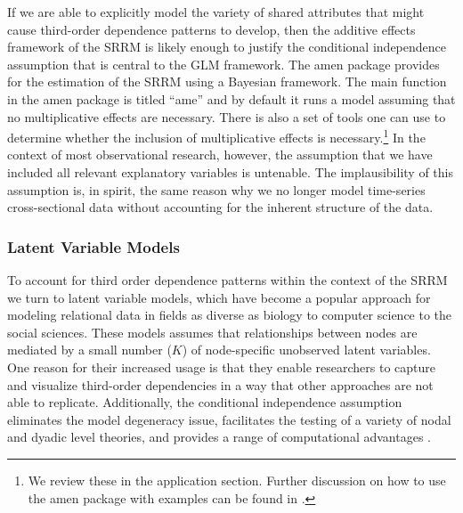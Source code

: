 \documentclass[12pt,onesided,pdflatex]{amsart}
\newcommand{\pkg}[1]{{\fontseries{b}\selectfont #1}}
\begin{document}
If we are able to explicitly model the variety of shared attributes that might cause third-order dependence patterns to develop, then the additive effects framework of the SRRM is likely enough to justify the conditional independence assumption that is central to the GLM framework. The \pkg{amen} package provides for the estimation of the SRRM using a Bayesian framework. The main function in the \pkg{amen} package is titled ``ame'' and by default it runs a model assuming that no multiplicative effects are necessary. There is also a set of tools one can use to determine whether the inclusion of multiplicative effects is necessary.\footnote{We review these in the application section. Further discussion on how to use the \pkg{amen} package with examples can be found in \citet{hoff:2015:arxiv}.} In the context of most observational research, however, the assumption that we have included all relevant explanatory variables is untenable. The implausibility of this assumption is, in spirit, the same reason why we no longer model time-series cross-sectional data without accounting for the inherent structure of the data.

\subsubsection{\textbf{Latent Variable Models}}

To account for third order dependence patterns within the context of the SRRM we turn to latent variable models, which have become a popular approach for modeling relational data in fields as diverse as biology to computer science to the social sciences. These models assumes that relationships between nodes are mediated by a small number ($K$) of node-specific unobserved latent variables. One reason for their increased usage is that they enable researchers to capture and visualize third-order dependencies in a way that other approaches are not able to replicate. Additionally, the conditional independence assumption eliminates the model degeneracy issue, facilitates the testing of a variety of nodal and dyadic level theories, and provides a range of computational advantages \citep{hunter:etal:2012}. 
\end{document}

